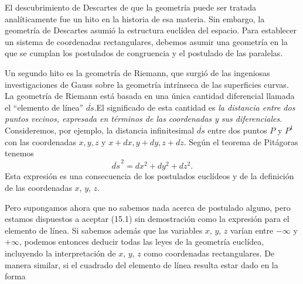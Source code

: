 \documentclass[12pt,a4paper]{book}
\begin{document}
\begin{center}
El descubrimiento de Descartes de que la geometr\'ia puede ser tratada anal\'iticamente fue un hito en la historia de esa materia. Sin embargo, la geometr\'ia de Descartes asumi\'o la estructura eucl\'idea del espacio. Para establecer un sistema de coordenadas rectangulares, debemos asumir una geometr\'ia en la que se cumplan los postulados de congruencia y el postulado de las paralelas.

Un segundo hito es la geometr\'ia de Riemann, que surgi\'o de las ingeniosas investigaciones de Gauss sobre la geometr\'ia intr\'inseca de las superficies curvas. La geometr\'ia de Riemann est\'a basada en una \'unica cantidad diferencial llamada el ``elemento de l\'inea'' $\overline{ds}$.\footnotemark[1] El significado de esta cantidad es \textit{la distancia entre dos puntos vecinos, expresada en t\'erminos de las coordenadas y sus diferenciales}. Consideremos, por ejemplo, la distancia infinitesimal $\overline{ds}$ entre dos puntos $P$ y $P^1$ con las coordenadas $x, y, z$ y $x + dx, y + dy, z + dz$. Seg\'un el teorema de Pit\'agoras tenemos
\begin{equation}
\overline{ds}^{\,2} = dx^2 + dy^2 + dz^2.
\tag{15.1}
\end{equation}
Esta expresi\'on es una consecuencia de los postulados eucl\'ideos y de la definici\'on de las coordenadas $x$, $y$, $z$.

Pero supongamos ahora que no sabemos nada acerca de postulado alguno, pero estamos dispuestos a aceptar (15.1) sin demostraci\'on como la expresi\'on para el elemento de l\'inea. Si sabemos adem\'as que las variables $x$, $y$, $z$ var\'ian entre $-\infty$ y $+\infty$, podemos entonces deducir todas las leyes de la geometr\'ia eucl\'idea, incluyendo la interpretaci\'on de $x$, $y$, $z$ como coordenadas rectangulares. De manera similar, si el cuadrado del elemento de l\'inea resulta estar dado en la forma



\end{center}
\end{document}

